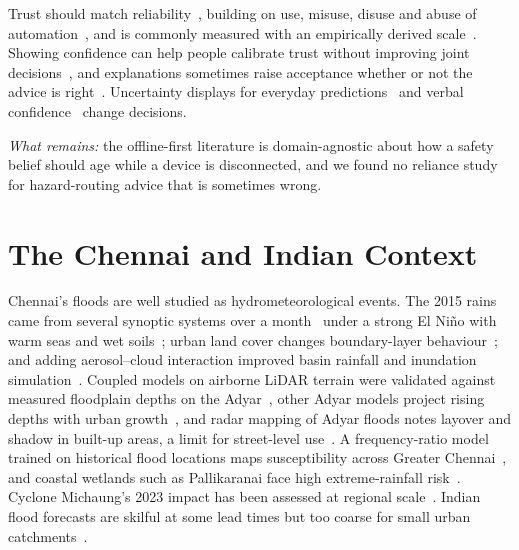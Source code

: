 \documentclass[journal]{IEEEtran}
\begin{document}
Trust should match reliability~\cite{lee2004trust}, building on use, misuse, disuse and abuse of automation~\cite{parasuraman1997humans}, and is commonly measured with an empirically derived scale~\cite{jian2000trust}. Showing confidence can help people calibrate trust without improving joint decisions~\cite{zhang2020confidence}, and explanations sometimes raise acceptance whether or not the advice is right~\cite{bansal2021whole}. Uncertainty displays for everyday predictions~\cite{kay2016bus} and verbal confidence~\cite{padilla2021uncertain} change decisions.

\emph{What remains:} the offline-first literature is domain-agnostic about how a safety belief should age while a device is disconnected, and we found no reliance study for hazard-routing advice that is sometimes wrong.

\section{The Chennai and Indian Context}\label{sec:india}
Chennai's floods are well studied as hydrometeorological events. The 2015 rains came from several synoptic systems over a month~\cite{panda2022observed} under a strong El Ni\~no with warm seas and wet soils~\cite{dutta2024uncovering}; urban land cover changes boundary-layer behaviour~\cite{rath2018study}; and adding aerosol--cloud interaction improved basin rainfall and inundation simulation~\cite{paul2026aerosols}. Coupled models on airborne LiDAR terrain were validated against measured floodplain depths on the Adyar~\cite{k2026monitoring}, other Adyar models project rising depths with urban growth~\cite{anuthaman2023modelling,kannapiran2024flood}, and radar mapping of Adyar floods notes layover and shadow in built-up areas, a limit for street-level use~\cite{sundaram2023mapping}. A frequency-ratio model trained on historical flood locations maps susceptibility across Greater Chennai~\cite{natarajan2021flood}, and coastal wetlands such as Pallikaranai face high extreme-rainfall risk~\cite{rakkasagi2024evaluating}. Cyclone Michaung's 2023 impact has been assessed at regional scale~\cite{mishra2024rapid}. Indian flood forecasts are skilful at some lead times but too coarse for small urban catchments~\cite{nanditha2021need}.
\end{document}
